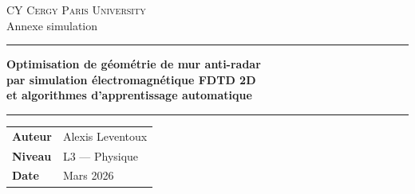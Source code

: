 \documentclass[12pt,a4paper]{article}
\numberwithin{equation}{section}
\numberwithin{figure}{section}
\numberwithin{table}{section}
\begin{document}
\begin{titlepage}
\centering
\vspace*{1cm}

{\Large \textsc{CY Cergy Paris University}}\\[0.5cm]
{\large Annexe simulation}\\[2cm]

\hrule height 1.5pt \vspace{0.4cm}
{\LARGE \bfseries Optimisation de géométrie de mur anti-radar}\\[0.3cm]
{\Large \bfseries par simulation électromagnétique FDTD 2D}\\[0.2cm]
{\Large \bfseries et algorithmes d'apprentissage automatique}\\[0.3cm]
\hrule height 1.5pt

\vspace{1.5cm}

\begin{tabular}{ll}
\textbf{Auteur} & Alexis Leventoux \\[0.2cm]
\textbf{Niveau} & L3 --- Physique\\[0.2cm]
\textbf{Date} & Mars 2026 \\
\end{tabular}

\vspace{1.5cm}

\begin{abstract}
\noindent
Ce rapport présente la conception, la modélisation physique et l'implémentation
numérique d'un système d'optimisation de surface anti-radar.
L'objectif est de minimiser la \emph{Section Efficace Radar} (SER, ou RCS en anglais)
d'un mur conducteur parfait (PEC) par action sur sa géométrie.

La modélisation repose sur la méthode \emph{Finite-Difference Time-Domain}
(FDTD) en polarisation TMz, qui résout les équations de Maxwell sur une grille
de Yee 2D. La source est injectée par la technique
\emph{Total-Field / Scattered-Field} (TFSF), les frontières sont absorbées par
une couche \emph{Convolutional PML} (CPML), et la SER est calculée via une
transformation champ proche --- champ lointain (NTFF).

L'optimisation de la forme du mur est assurée par un \emph{Algorithme Génétique} (GA) avec croisement SBX et
mutation polynomiale adaptive (règle du 1/5 de Rechenberg). Des réductions de SER supérieures
à $\mathbf{90\,\%}$ sont obtenues par rapport à un mur plat de référence.
\end{abstract}

\vfill
\end{titlepage}
\end{document}
